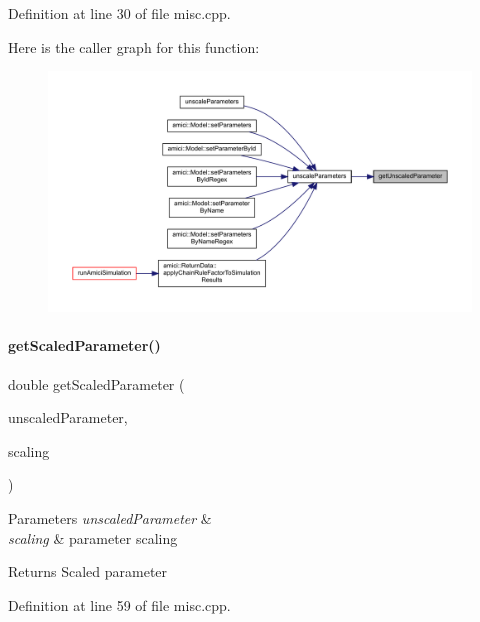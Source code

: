 Definition at line 30 of file misc.\+cpp.

Here is the caller graph for this function\+:
\nopagebreak
\begin{figure}[H]
\begin{center}
\leavevmode
\includegraphics[width=350pt]{namespaceamici_a7e1720941869974da1ca8dbd6cd9e936_icgraph}
\end{center}
\end{figure}
\mbox{\label{namespaceamici_a9ef646fefe61eae18051851bbb2f3e5b}} 
\paragraph{\texorpdfstring{getScaledParameter()}{getScaledParameter()}}
{\footnotesize\ttfamily double get\+Scaled\+Parameter (\begin{DoxyParamCaption}\item[{double}]{unscaled\+Parameter,  }\item[{\mbox{\hyperlink{namespaceamici_a42f062082226e9284c201d9eab71a3a0}{Parameter\+Scaling}}}]{scaling }\end{DoxyParamCaption})}


\begin{DoxyParams}{Parameters}
{\em unscaled\+Parameter} & \\
\hline
{\em scaling} & parameter scaling \\
\hline
\end{DoxyParams}
\begin{DoxyReturn}{Returns}
Scaled parameter 
\end{DoxyReturn}


Definition at line 59 of file misc.\+cpp.

